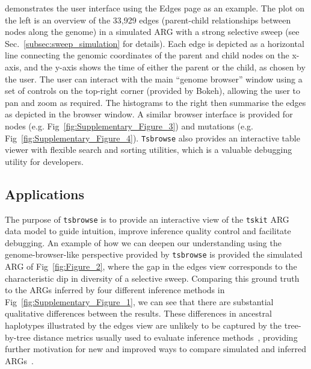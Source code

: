 \documentclass[unnumsec,webpdf,contemporary,large,namedate]{oup-authoring-template}%
\begin{document}
demonstrates the user interface using the Edges page as an example. 
The plot on the left is an overview of the 33,929 edges 
(parent-child relationships between nodes along the genome)
in a simulated ARG with a strong selective sweep (see
Sec.~\ref{subsec:sweep_simulation} for details).
Each edge is depicted as a horizontal line connecting the genomic coordinates of the
parent and child nodes on the x-axis, and the y-axis shows the time of 
either the parent or the child, as chosen by the user.
The user can interact with the main ``genome browser'' window
using a set of controls on the top-right corner (provided by Bokeh),
allowing the user to pan and zoom as required. The histograms to the
right then summarise the edges as depicted in the browser window.
A similar browser interface is provided for 
nodes
(e.g. Fig~\ref{fig:Supplementary_Figure_3}) 
and mutations 
(e.g. Fig~\ref{fig:Supplementary_Figure_4}).
\texttt{Tsbrowse} also provides an interactive table viewer with flexible
search and sorting utilities, which is a valuable debugging utility for 
developers.


\subsection{Applications}
The purpose of \texttt{tsbrowse} is to provide an interactive view of the 
\texttt{tskit} ARG data model to guide intuition, improve inference quality control
and facilitate debugging. An example of how we can deepen our understanding
using the genome-browser-like perspective provided by \texttt{tsbrowse}
is provided the simulated ARG of Fig~\ref{fig:Figure_2}, where 
the gap in the edges view corresponds to the characteristic dip in diversity
of a selective sweep. Comparing this ground truth to the ARGs inferred
by four different inference methods in Fig~\ref{fig:Supplementary_Figure_1},
we can see that there are substantial qualitative differences between the
results. These differences in ancestral haplotypes illustrated by 
the edges view are unlikely to be captured by the tree-by-tree distance
metrics usually used to evaluate
inference methods~\citep[e.g.][]{kelleher2019inferring,zhang2023biobank},
providing further motivation for new and improved ways to compare
simulated and inferred ARGs~\citep{fritze2024forest}.
\end{document}
